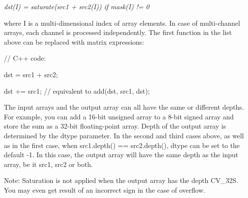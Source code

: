 {\itshape dst(\+I) = saturate(src1 + src2(\+I)) if mask(\+I) != 0}

where {\ttfamily I} is a multi-\/dimensional index of array elements. In case of multi-\/channel arrays, each channel is processed independently. The first function in the list above can be replaced with matrix expressions\+: {\ttfamily }

{\ttfamily }

{\ttfamily }

{\ttfamily // C++ code\+:}

{\ttfamily }

{\ttfamily }

{\ttfamily dst = src1 + src2;}

{\ttfamily }

{\ttfamily }

{\ttfamily dst += src1; // equivalent to add(dst, src1, dst);}

{\ttfamily }

{\ttfamily }

{\ttfamily The input arrays and the output array can all have the same or different depths. For example, you can add a 16-\/bit unsigned array to a 8-\/bit signed array and store the sum as a 32-\/bit floating-\/point array. Depth of the output array is determined by the {\ttfamily dtype} parameter. In the second and third cases above, as well as in the first case, when {\ttfamily src1.\+depth() == src2.\+depth()}, {\ttfamily dtype} can be set to the default {\ttfamily -\/1}. In this case, the output array will have the same depth as the input array, be it {\ttfamily src1}, {\ttfamily src2} or both. }

Note\+: Saturation is not applied when the output array has the depth {\ttfamily C\+V\+\_\+32S}. You may even get result of an incorrect sign in the case of overflow.


